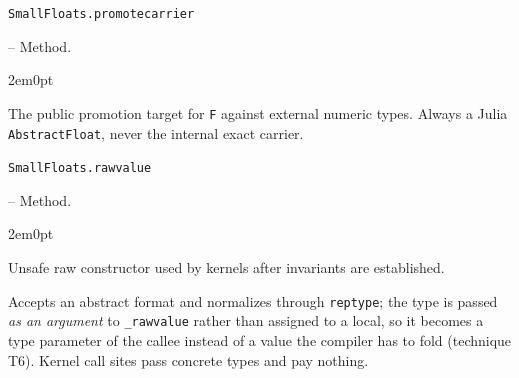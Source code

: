 \par\medskip\noindent\begin{minipage}{\linewidth}
\hypertarget{3869604513100043477}{\texttt{SmallFloats.promotecarrier}}  -- {Method.}
\nopagebreak
\begin{adjustwidth}{2em}{0pt}

The public promotion target for \texttt{F} against external numeric types. Always a Julia \texttt{AbstractFloat}, never the internal exact carrier.



\end{adjustwidth}
\end{minipage}
\par\medskip

\par\medskip\noindent\begin{minipage}{\linewidth}
\hypertarget{8685776062322191570}{\texttt{SmallFloats.rawvalue}}  -- {Method.}
\nopagebreak
\begin{adjustwidth}{2em}{0pt}

Unsafe raw constructor used by kernels after invariants are established.

Accepts an abstract format and normalizes through \texttt{reptype}; the type is passed \emph{as an argument} to \texttt{\_\allowbreak{}rawvalue} rather than assigned to a local, so it becomes a type parameter of the callee instead of a value the compiler has to fold (technique T6). Kernel call sites pass concrete types and pay nothing.



\end{adjustwidth}
\end{minipage}
\par\medskip

